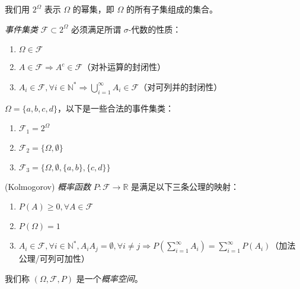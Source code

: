 \documentclass[../main.tex]{subfiles}
\begin{document}
我们用 $2^\Omega$ 表示 $\Omega$ 的幂集，即 $\Omega$ 的所有子集组成的集合。

\begin{definition}\label{def:1.5.1}
    \emph{事件集类} $\mathcal{F}\subset 2^\Omega$ 必须满足所谓 $\sigma$-代数的性质：
    \begin{enumerate}
        \item $\Omega\in\mathcal{F}$
        \item $A\in\mathcal{F}\Rightarrow A^c\in\mathcal{F}$（对补运算的封闭性）
        \item $A_i\in\mathcal{F},\forall i\in\mathbb{N}^*\Rightarrow \bigcup_{i=1}^\infty A_i\in\mathcal{F}$（对可列并的封闭性）
    \end{enumerate}
\end{definition}

\begin{example}
    $\Omega=\{a,b,c,d\}$，以下是一些合法的事件集类：
    \begin{enumerate}
        \item $\mathcal{F}_1=2^\Omega$
        \item $\mathcal{F}_2=\{\Omega,\emptyset\}$
        \item $\mathcal{F}_3=\{\Omega,\emptyset,\{a,b\},\{c,d\}\}$
    \end{enumerate}
\end{example}

\begin{definition}\label{def:1.5.2}
    (Kolmogorov) \emph{概率函数} $P:\mathcal{F}\rightarrow\mathbb{R}$ 是满足以下三条公理的映射：
    \begin{enumerate}
        \item $P(A)\geq 0,\forall A\in\mathcal{F}$
        \item $P(\Omega)=1$
        \item $A_i\in\mathcal{F},\forall i\in\mathbb{N}^*,A_iA_j=\emptyset,\forall i\neq j\Rightarrow P(\sum_{i=1}^\infty A_i)=\sum_{i=1}^\infty P(A_i)$（加法公理/可列可加性）
    \end{enumerate}
    我们称 $(\Omega,\mathcal{F},P)$ 是一个\emph{概率空间}。
\end{definition}
\end{document}
